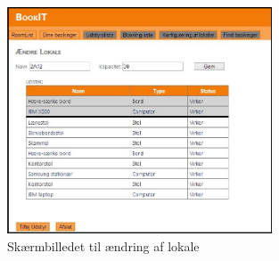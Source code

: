 \begin{figure}[h!]
  \centering
    \includegraphics[width=0.7\textwidth]{Appendix/GUI-Prototype/DigitalMockup/AendreLokale}
  \caption{Skærmbilledet til ændring af lokale}
\label{App_GUI_final_AendreLokale}
\end{figure}